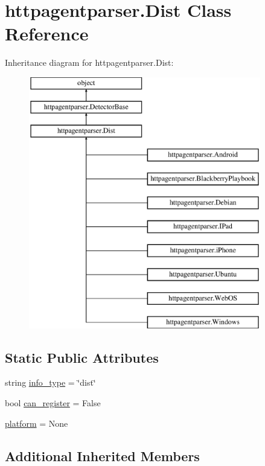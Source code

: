 \hypertarget{classhttpagentparser_1_1_dist}{}\section{httpagentparser.\+Dist Class Reference}
\label{classhttpagentparser_1_1_dist}
Inheritance diagram for httpagentparser.\+Dist\+:\begin{figure}[H]
\begin{center}
\leavevmode
\includegraphics[height=11.000000cm]{classhttpagentparser_1_1_dist}
\end{center}
\end{figure}
\subsection*{Static Public Attributes}
\begin{DoxyCompactItemize}
\item 
string \hyperlink{classhttpagentparser_1_1_dist_ac71184777234ecc4b678320019ce3eba}{info\+\_\+type} = \char`\"{}dist\char`\"{}
\item 
bool \hyperlink{classhttpagentparser_1_1_dist_ab0639d56fb82147e719c57826856239e}{can\+\_\+register} = False
\item 
\hyperlink{classhttpagentparser_1_1_dist_aa5cded10ecc5fbcd6fff70698c08a140}{platform} = None
\end{DoxyCompactItemize}
\subsection*{Additional Inherited Members}


